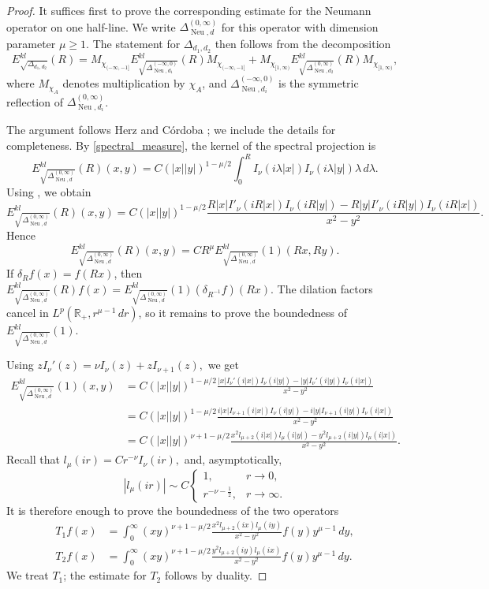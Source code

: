 \documentclass[12pt]{amsart}
\newcommand\Neu{\operatorname{Neu}}
\newcommand\LapoN{\Delta^{(0, \infty)}_{\Neu, d}}
\newcommand\Lapd{\Delta_{d_1, d_2}}
\begin{document}
\begin{proof}
It suffices first to prove the corresponding estimate for the Neumann
operator on one half-line. We write $\LapoN$ for this operator with
dimension parameter $\mu \ge 1$. The statement for $\Lapd$ then follows from
the decomposition
\begin{equation}\label{eq:Lapd-decomposition}
E_{\sqrt{\Lapd}}^{kl}(R)
=
M_{\chi_{(-\infty,-1]}}
E_{\sqrt{\Delta^{(-\infty,0)}_{\Neu,d_1}}}^{kl}(R)
M_{\chi_{(-\infty,-1]}}
+
M_{\chi_{[1,\infty)}}
E_{\sqrt{\Delta^{(0,\infty)}_{\Neu,d_2}}}^{kl}(R)
M_{\chi_{[1,\infty)}},
\end{equation}
where $M_{\chi_A}$ denotes multiplication by $\chi_A$, and
$\Delta^{(-\infty,0)}_{\Neu,d_i}$ is the symmetric reflection of
$\Delta^{(0,\infty)}_{\Neu,d_i}$.

The argument follows Herz \cite{Herz} and Córdoba \cite{cordoba}; we
include the details for completeness. By \eqref{spectral_measure}, the
kernel of the spectral projection is
\[
E_{\sqrt{\LapoN}}^{kl}(R)(x,y)
=
C(|x||y|)^{1-\mu/2}
\int_0^R I_{\nu}(i\lambda |x|)I_{\nu}(i\lambda |y|)
\lambda\,d\lambda .
\]
Using \cite[6.521]{Grad-Ry}, we obtain
\[
E_{\sqrt{\LapoN}}^{kl}(R)(x,y)
=
C(|x||y|)^{1-\mu/2}
\frac{
R|x| I'_{\nu}(iR|x|) I_\nu(iR|y|)
-
R|y| I'_{\nu}(iR|y|) I_\nu(iR|x|)
}{x^2-y^2}.
\]
Hence
\[
    E_{\sqrt{\LapoN}}^{kl}(R)(x,y)
    =
    C R^\mu E_{\sqrt{\LapoN}}^{kl}(1)(Rx,Ry).
\]
If $\delta_R f(x)=f(Rx)$, then
\(E_{\sqrt{\LapoN}}^{kl}(R)f(x)
    =
    E_{\sqrt{\LapoN}}^{kl}(1)(\delta_{R^{-1}}f)(Rx)
\).
The dilation factors cancel in
$L^p(\mathbb{R}_+,r^{\mu-1}\,dr)$, so it remains to prove the boundedness
of $E_{\sqrt{\LapoN}}^{kl}(1)$.

Using
\(zI_\nu'(z)=\nu I_\nu(z)+zI_{\nu+1}(z),
\)
we get
\begin{align}
E_{\sqrt{\LapoN}}^{kl}(1)(x,y)
&=
C(|x||y|)^{1-\mu/2}
\frac{
|x| I_\nu'(i|x|)I_\nu(i|y|)
-
|y| I_\nu'(i|y|)I_\nu(i|x|)
}{x^2-y^2}
\nonumber\\
&=
C(|x||y|)^{1-\mu/2}
\frac{
i|x|I_{\nu+1}(i|x|)I_\nu(i|y|)
-
i|y|I_{\nu+1}(i|y|)I_\nu(i|x|)
}{x^2-y^2}
\nonumber\\
&=
C(|x||y|)^{\nu+1-\mu/2}
\frac{
x^2 l_{\mu+2}(i|x|)l_\mu(i|y|)
-
y^2 l_{\mu+2}(i|y|)l_\mu(i|x|)
}{x^2-y^2}.
\label{1}
\end{align}
Recall that
\(l_\mu(ir)=C r^{-\nu}I_\nu(ir),
\)
and, asymptotically,
\[
|l_\mu(ir)|\sim C
\begin{cases}
1, & r\to 0,\\[1mm]
r^{-\nu-\frac12}, & r\to\infty .
\end{cases}
\]
It is therefore enough to prove the boundedness of the two operators
\begin{align*}
T_1 f(x)
&=
\int_0^\infty
(xy)^{\nu+1-\mu/2}
\frac{x^2 l_{\mu+2}(ix)l_\mu(iy)}{x^2-y^2}
f(y)y^{\mu-1}\,dy,\\
T_2 f(x)
&=
\int_0^\infty
(xy)^{\nu+1-\mu/2}
\frac{y^2 l_{\mu+2}(iy)l_\mu(ix)}{x^2-y^2}
f(y)y^{\mu-1}\,dy .
\end{align*}
We treat $T_1$; the estimate for $T_2$ follows by duality.


\end{proof}
\end{document}
